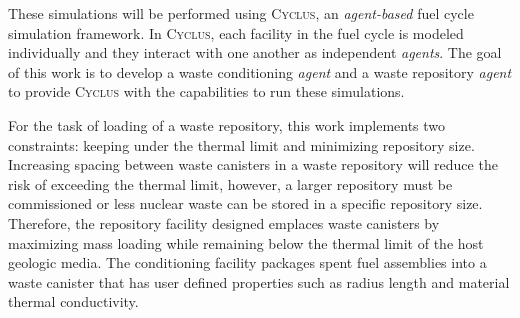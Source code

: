\documentclass{anstrans}
\begin{document}
These simulations will be performed using \textsc{Cyclus}, an 
\textit{agent-based} fuel cycle simulation framework. 
In \textsc{Cyclus}, each facility in the fuel cycle is modeled individually 
and they interact with one another as independent \textit{agents}. 
The goal of this work is to develop a waste conditioning \textit{agent} 
and a waste repository \textit{agent} to provide \textsc{Cyclus} with 
the capabilities to run these simulations. 

For the task of loading of a waste repository, this work implements two 
constraints: keeping under the thermal limit and minimizing repository size. 
Increasing spacing between waste canisters in a waste repository will reduce 
the risk of exceeding the thermal limit, however, a larger repository must be 
commissioned or less nuclear waste can be stored in a specific repository size. 
Therefore, the repository facility designed emplaces waste canisters by 
maximizing mass loading while remaining below the thermal limit of the 
host geologic media. The conditioning facility packages spent fuel assemblies 
into a waste canister that has user defined properties such as radius length 
and material thermal conductivity. 




\end{document}
